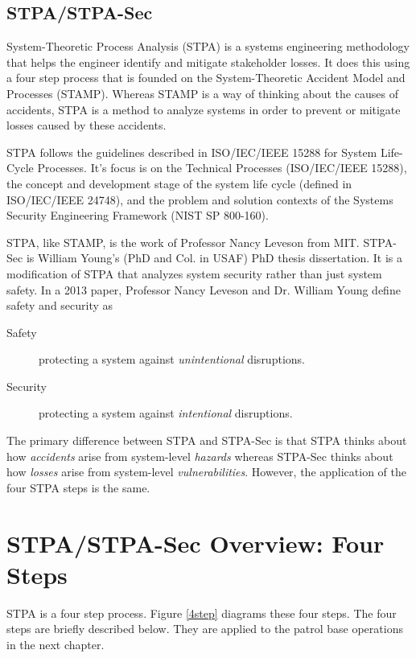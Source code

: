 \documentclass[../../main/main.tex]{subfiles}
\begin{document}
\subsection{STPA/STPA-Sec}\label{ssec:stpa}
System-Theoretic Process Analysis (STPA) is a systems engineering methodology that helps the engineer identify and mitigate stakeholder losses. It does this using a four step process that is founded on the System-Theoretic Accident Model and Processes (STAMP).  Whereas STAMP is a way of thinking about the causes of accidents, STPA is a method to analyze systems in order to prevent or mitigate losses caused by these accidents.  

STPA follows the guidelines described in ISO/IEC/IEEE 15288 for System Life-Cycle Processes.  It's focus is on the Technical Processes (ISO/IEC/IEEE 15288), the concept and development stage of the system life cycle (defined in ISO/IEC/IEEE 24748), and the problem and solution contexts of the Systems Security Engineering Framework (NIST SP 800-160).


STPA, like STAMP, is the work of Professor Nancy Leveson from MIT.  STPA-Sec is William Young's (PhD and Col. in USAF) PhD thesis dissertation.  It is a modification of STPA that analyzes system security rather than just system safety.  In a 2013 paper, Professor Nancy Leveson and Dr. William Young define safety and security as
\begin{description}
\item[ Safety ] protecting a system against \textit{unintentional} disruptions.
\item[ Security ] protecting a system against \textit{intentional} disruptions.
\end{description}
The primary difference between STPA and STPA-Sec is that STPA thinks about how \textit{accidents} arise from system-level \textit{hazards} whereas STPA-Sec thinks about how \textit{losses} arise from system-level \textit{vulnerabilities}.  However, the application of the four STPA steps is the same.


\section{STPA/STPA-Sec Overview: Four Steps}
STPA is a four step process.  Figure \ref{4step} diagrams these four steps.  The four steps are briefly described below.  They are applied to the patrol base operations in the next chapter. 
\end{document}
